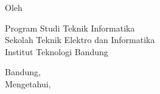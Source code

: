 \clearpage
\pagestyle{empty}

\begin{center}
    \smallskip

    \Large \bfseries \MakeUppercase{\thetitle}
    \vfill

    \subtitle
    \vfill

    \large Oleh

    \Large \theauthor

    \large Program Studi Teknik Informatika \\

    \normalsize \normalfont
    Sekolah Teknik Elektro dan Informatika \\
    Institut Teknologi Bandung

    \thedate
    \vfill

    Bandung, \thedate \\
    Mengetahui,
    \advisorapproval

\end{center}
\clearpage
